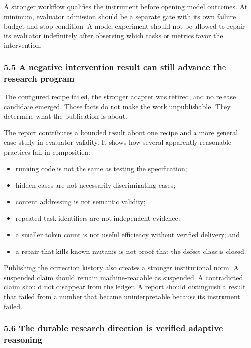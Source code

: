 \documentclass[
]{article}
\providecommand{\tightlist}{%
  \setlength{\itemsep}{0pt}\setlength{\parskip}{0pt}}
\begin{document}
A stronger workflow qualifies the instrument before opening model
outcomes. At minimum, evaluator admission should be a separate gate with
its own failure budget and stop condition. A model experiment should not
be allowed to repair its evaluator indefinitely after observing which
tasks or metrics favor the intervention.

\subsubsection{5.5 A negative intervention result can still advance the
research
program}\label{55-a-negative-intervention-result-can-still-advance-the-research-program}

The configured recipe failed, the stronger adapter was retired, and no
release candidate emerged. Those facts do not make the work
unpublishable. They determine what the publication is about.

The report contributes a bounded result about one recipe and a more
general case study in evaluator validity. It shows how several
apparently reasonable practices fail in composition:

\begin{itemize}
\tightlist
\item
  running code is not the same as testing the specification;
\item
  hidden cases are not necessarily discriminating cases;
\item
  content addressing is not semantic validity;
\item
  repeated task identifiers are not independent evidence;
\item
  a smaller token count is not useful efficiency without verified
  delivery; and
\item
  a repair that kills known mutants is not proof that the defect class
  is closed.
\end{itemize}

Publishing the correction history also creates a stronger institutional
norm. A suspended claim should remain machine-readable as suspended. A
contradicted claim should not disappear from the ledger. A report should
distinguish a result that failed from a number that became
uninterpretable because its instrument failed.

\subsubsection{5.6 The durable research direction is verified adaptive
reasoning}\label{56-the-durable-research-direction-is-verified-adaptive-reasoning}
\end{document}
